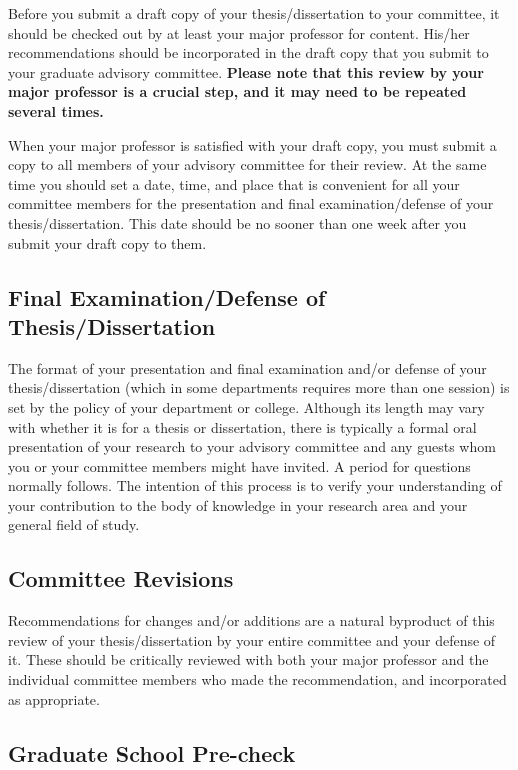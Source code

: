Before you submit a draft copy of your the\-sis/dis\-ser\-ta\-tion to
your committee, it should be checked out by at least your major
professor for content. His/her recommendations should be incorporated
in the draft copy that you submit to your graduate advisory committee.
\textbf{Please note that this review by your major professor is a
  crucial step, and it may need to be repeated several times.}

When your major professor is satisfied with your draft copy, you must
submit a copy to all members of your advisory committee for their
review. At the same time you should set a date, time, and place that
is convenient for all your committee members for the presentation and
final ex\-am\-i\-na\-tion/de\-fense of your
the\-sis/dis\-ser\-ta\-tion. This date should be no sooner than one
week after you submit your draft copy to them.

\subsection{Final Examination/Defense of Thesis/Dissertation}
\label{sec:FinalExaminationDefenseOfThesisDissertation}

The format of your presentation and final examination and/or defense
of your the\-sis/dis\-ser\-ta\-tion (which in some departments
requires more than one session) is set by the policy of your
department or college.  Although its length may vary with whether it
is for a thesis or dissertation, there is typically a formal oral
presentation of your research to your advisory committee and any
guests whom you or your committee members might have invited. A period
for questions normally follows. The intention of this process is to
verify your understanding of your contribution to the body of
knowledge in your research area and your general field of study.

\subsection{Committee Revisions}
\label{sec:CommitteeRevisions}

Recommendations for changes and/or additions are a natural
by\-prod\-uct of this review of your the\-sis/dis\-ser\-ta\-tion by
your entire committee and your defense of it. These should be
critically reviewed with both your major professor and the individual
committee members who made the recommendation, and incorporated as
appropriate.

\subsection{Graduate School Pre-check}
\label{sec:GraduateSchoolPrecheck}

